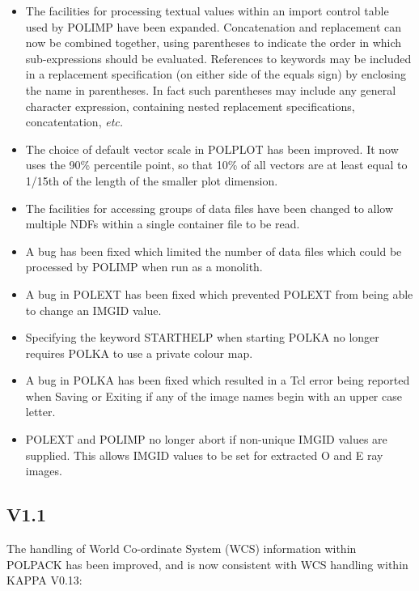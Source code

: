 \documentclass[twoside,11pt]{article}
\newcommand{\htmlref}[2]{#1}
\renewcommand{\_}{\texttt{\symbol{95}}}
\begin{document}
\begin{itemize}
\item The facilities for processing textual values within an import
control table used by \htmlref{POLIMP}{POLIMP} have been expanded.
Concatenation and replacement can now be combined together, using
parentheses to indicate the order in which sub-expressions should be
evaluated. References to keywords may be included in a replacement
specification (on either side of the equals sign) by enclosing the name 
in parentheses. In fact such parentheses may include any general
character expression, containing nested replacement specifications,
concatentation, \emph{etc.}

\item The choice of default vector scale in \htmlref{POLPLOT}{POLPLOT}
has been improved. It now uses the 90\% percentile point, so that 10\% of 
all vectors are at least equal to 1/15th of the length of the smaller plot
dimension.

\item The facilities for accessing groups of data files have been changed
to allow multiple NDFs within a single container file to be read. 

\item A bug has been fixed which limited the number of data files which 
could be processed by \htmlref{POLIMP}{POLIMP} when run as a monolith.

\item A bug in \htmlref{POLEXT}{POLEXT} has been fixed which prevented 
POLEXT from being able to change an IMGID value. 

\item Specifying the keyword STARTHELP when starting \htmlref{POLKA}{POLKA} 
no longer requires POLKA to use a private colour map.

\item A bug in \htmlref{POLKA}{POLKA} has been fixed which resulted in a
Tcl error being reported when Saving or Exiting if any of the image names 
begin with an upper case letter.

\item \htmlref{POLEXT}{POLEXT} and \htmlref{POLIMP}{POLIMP} no longer abort
if non-unique IMGID values are supplied. This allows IMGID values to be set 
for  extracted O and E ray images.

\end{itemize}



\subsection{V1.1}
The handling of World Co-ordinate System (WCS) information within POLPACK
has been improved, and is now consistent with WCS handling within KAPPA
V0.13:
\end{document}
